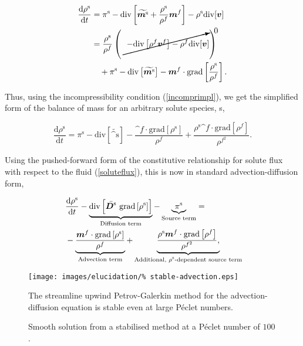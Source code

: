 \begin{equation}
\begin{split}
\frac{\mathrm{d}\rho^\mathrm{s}}{\mathrm{d}t} &= \pi^\mathrm{s}-
\mathrm{div} \left[\widetilde{\bm^\mathrm{s}}+
\frac{\rho^\mathrm{s}}{\rho^f}\bm^f\right] - \rho^\mathrm{s}
\mathrm{div}[\bv]\\ &= \frac{\rho^\mathrm{s}}{\rho^f}\left(\cancelto{0}
{-\mathrm{div}\left[\rho^f \bv^{f}\right] - \rho^f
\mathrm{div}[\bv]}\right)\\ &\quad{} + \pi^\mathrm{s} -
\mathrm{div}\left[\widetilde{\bm^\mathrm{s}}\right]
-\bm^f\cdot\mathrm{grad}\left[\frac{ \rho^\mathrm{s}}{\rho^f}\right].\\
\end{split}
\end{equation}

Thus, using the incompressibility condition (\ref{incomprimpl}), we
get the simplified form of the balance of mass for an arbitrary solute
species, s,

\begin{equation}
\frac{\mathrm{d}\rho^\mathrm{s}}{\mathrm{d}t}=\pi^\mathrm{s} -
\mathrm{div}\left[\widetilde{\bm^\mathrm{s}}\right] -
\frac{\bm^f\cdot\mathrm{grad}\left[\rho^\mathrm{s}\right]}{\rho^f} +
\frac{\rho^\mathrm{s} \bm^f \cdot \mathrm{grad}\left[\rho^f\right]}
{\rho^{f^2}}.
\label{stdform}
\end{equation}

\noindent Using the pushed-forward form of the constitutive
relationship for solute flux with respect to the fluid
(\ref{soluteflux}), this is now in standard advection-diffusion form,

\begin{equation}
\begin{split}
& \frac{\mathrm{d}\rho^\mathrm{s}}{\mathrm{d}t} - \underbrace{
    \mathrm{div}\left[\bar{\mbox{\boldmath$ D$}^\mathrm{s}}\ \mathrm{grad} \left[
        \rho^\mathrm{s}\right]\right]}_\text{Diffusion term} -
  \underbrace{\pi^\mathrm{s}}_\text{Source term} = \\ \ & -
  \underbrace{\frac{\mbox{\boldmath$ m$}^f\cdot\mathrm{grad}
      \left[\rho^\mathrm{s}\right]}{\rho^f}} _\text{Advection term} +
  \underbrace{ \frac{\rho^\mathrm{s} \mbox{\boldmath$ m$}^f \cdot
      \mathrm{grad}\left[\rho^f\right]}
    {\rho^{f^2}},}_\text{Additional, $\rho^\mathrm{s}$-dependent
    source term}
\end{split}
\label{morestdform}
\end{equation}

\begin{figure}
  \begin{center}
    \texttt{[image: images/elucidation/\%
      stable-advection.eps]}
    \caption{Smooth solution from a stabilised method at a P\'eclet
      number of $100$.}
    \label{stable-solution}
  \end{center}
      {The streamline upwind Petrov-Galerkin method for the
        advection-diffusion equation is stable even at large P\'eclet
        numbers.}
\end{figure}

